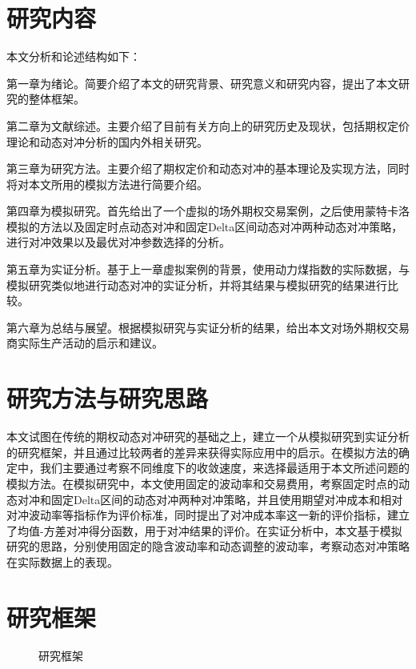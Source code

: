 \section{研究内容}

本文分析和论述结构如下：

第一章为绪论。简要介绍了本文的研究背景、研究意义和研究内容，提出了本文研究的整体框架。

第二章为文献综述。主要介绍了目前有关方向上的研究历史及现状，包括期权定价理论和动态对冲分析的国内外相关研究。

第三章为研究方法。主要介绍了期权定价和动态对冲的基本理论及实现方法，同时将对本文所用的模拟方法进行简要介绍。

第四章为模拟研究。首先给出了一个虚拟的场外期权交易案例，之后使用蒙特卡洛模拟的方法以及固定时点动态对冲和固定Delta区间动态对冲两种动态对冲策略，进行对冲效果以及最优对冲参数选择的分析。

第五章为实证分析。基于上一章虚拟案例的背景，使用动力煤指数的实际数据，与模拟研究类似地进行动态对冲的实证分析，并将其结果与模拟研究的结果进行比较。

第六章为总结与展望。根据模拟研究与实证分析的结果，给出本文对场外期权交易商实际生产活动的启示和建议。

\section{研究方法与研究思路}

本文试图在传统的期权动态对冲研究的基础之上，建立一个从模拟研究到实证分析的研究框架，并且通过比较两者的差异来获得实际应用中的启示。在模拟方法的确定中，我们主要通过考察不同维度下的收敛速度，来选择最适用于本文所述问题的模拟方法。在模拟研究中，本文使用固定的波动率和交易费用，考察固定时点的动态对冲和固定Delta区间的动态对冲两种对冲策略，并且使用期望对冲成本和相对对冲波动率等指标作为评价标准，同时提出了对冲成本率这一新的评价指标，建立了均值-方差对冲得分函数，用于对冲结果的评价。在实证分析中，本文基于模拟研究的思路，分别使用固定的隐含波动率和动态调整的波动率，考察动态对冲策略在实际数据上的表现。

\newpage
\section{研究框架}

\begin{figure}[!htp]
    \centering
    \resizebox{6cm}{!}{}
    \caption{研究框架}
    \label{fig:flow_chart}
\end{figure}
